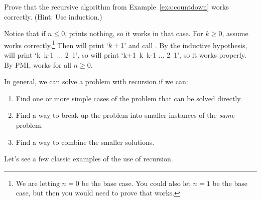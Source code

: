 \newpage
\begin{exer}
Prove that the recursive  algorithm from Example~\ref{exa:countdown} 
works correctly.
(Hint:  Use induction.)

\vspace*{1.75in}
\begin{answer}
Notice that if $n\leq 0$,  prints nothing, so it works in that case.
For $k\geq 0$, assume  works correctly.\footnote{We are letting $n=0$ be the base case.  
You could also let $n=1$ be the base case, but then you would need to prove that  works.}  
Then  will print `$k+1$' 
and call .  By the inductive hypothesis, 
 will print `k\, k-1\, $\ldots$ 2\, 1', so  will print `k+1\, k\, k-1 $\ldots$ 2\, 1',
so it works properly.  By PMI,   works for all $n\geq 0$.
\end{answer}
\end{exer}


In general, we can solve a problem with recursion if we can: 
\begin{enumerate}
\item
Find one or more simple cases of the problem that can be solved directly.
\item
Find a way to break up the problem into smaller instances of the {\em same} problem.
\item
Find a way to combine the smaller solutions.
\end{enumerate}

Let's see a few classic examples of the use of recursion.

